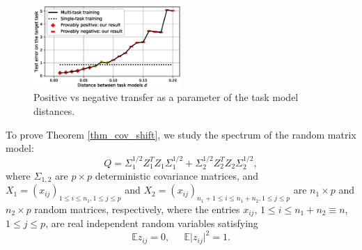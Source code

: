 \begin{figure}
	\centering
	\includegraphics[width=0.5\textwidth]{figures/model_shift_phase_transition.eps}
	\caption{Positive vs negative transfer as a parameter of the task model distances.}
	\label{fig_model_shift_phasetrans}
\end{figure}


\medskip
\noindent{}
To prove Theorem \ref{thm_cov_shift}, we study the spectrum of the random matrix model:
$$Q= \Sigma_1^{1/2}  Z_1^T Z_1 \Sigma_1^{1/2}  + \Sigma_2^{1/2}  Z_2^T Z_2 \Sigma_2^{1/2} ,$$
where $\Sigma_{1,2}$ are $p\times p$ deterministic covariance matrices, and $X_1=(x_{ij})_{1\le i \le n_1, 1\le j \le p}$ and $X_2=(x_{ij})_{n_1+1\le i \le n_1+n_2, 1\le j \le p}$ are $n_1\times p$ and $n_2 \times p$ random matrices, respectively, where the entries $x_{ij}$, $1 \leq i \leq n_1+n_2\equiv n$, $1 \leq j \leq p$, are real independent random variables satisfying
\begin{equation}\label{eq_12moment} %
\mathbb{E} z_{ij} =0, \ \quad \ \mathbb{E} \vert z_{ij} \vert^2  = 1.
\end{equation}


